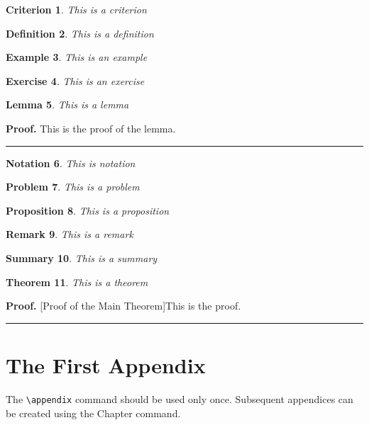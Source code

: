 \documentclass[letterpaper,12pt,openany,reqno]{book}%
\newtheorem{theorem}{Theorem}
\newtheorem{criterion}[theorem]{Criterion}
\newtheorem{definition}[theorem]{Definition}
\newtheorem{example}[theorem]{Example}
\newtheorem{exercise}[theorem]{Exercise}
\newtheorem{lemma}[theorem]{Lemma}
\newtheorem{notation}[theorem]{Notation}
\newtheorem{problem}[theorem]{Problem}
\newtheorem{proposition}[theorem]{Proposition}
\newtheorem{remark}[theorem]{Remark}
\newtheorem{summary}[theorem]{Summary}
\newenvironment{proof}[1][Proof]{\textbf{#1.} }{\ \rule{0.5em}{0.5em}}
\begin{document}
\begin{criterion}
This is a criterion
\end{criterion}

\begin{definition}
This is a definition
\end{definition}

\begin{example}
This is an example
\end{example}

\begin{exercise}
This is an exercise
\end{exercise}

\begin{lemma}
This is a lemma
\end{lemma}

\begin{proof}
This is the proof of the lemma.
\end{proof}

\begin{notation}
This is notation
\end{notation}

\begin{problem}
This is a problem
\end{problem}

\begin{proposition}
This is a proposition
\end{proposition}

\begin{remark}
This is a remark
\end{remark}

\begin{summary}
This is a summary
\end{summary}

\begin{theorem}
This is a theorem
\end{theorem}

\begin{proof}
[Proof of the Main Theorem]This is the proof.
\end{proof}

\appendix

\chapter{The First Appendix}

The \verb"\appendix" command should be used only once. Subsequent appendices can
be created using the Chapter command.
\end{document}
